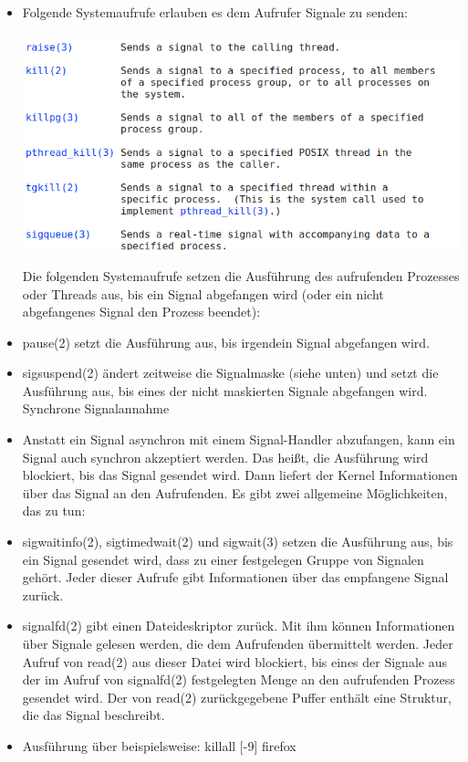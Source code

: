 \documentclass[a4paper]{article}
\begin{document}
\begin{itemize}
\begin{center}
          \end{center}
    \item Folgende Systemaufrufe erlauben es dem Aufrufer Signale zu senden:
          \begin{center}
              \includegraphics[width=0.5\linewidth]{Assets/Betriebssysteme_uebung/u6_a21.png}
          \end{center}
          Die  folgenden  Systemaufrufe setzen die Ausführung des aufrufenden Prozesses oder Threads aus, bis ein Signal abgefangen wird  (oder  ein  nicht  abgefangenes  Signal  den  Prozess
          beendet):
    \item pause(2) setzt die Ausführung aus, bis irgendein Signal abgefangen wird.
    \item sigsuspend(2)   ändert  zeitweise  die  Signalmaske (siehe unten) und setzt die Ausführung aus, bis eines der nicht maskierten Signale abgefangen wird. Synchrone Signalannahme
    \item Anstatt ein Signal asynchron mit einem Signal-Handler abzufangen,  kann  ein  Signal  auch synchron  akzeptiert  werden.  Das  heißt,  die  Ausführung wird blockiert, bis das Signal gesendet wird. Dann liefert der Kernel Informationen über das Signal an  den  Aufrufenden. Es gibt zwei allgemeine Möglichkeiten, das zu tun:
    \item sigwaitinfo(2), sigtimedwait(2) und sigwait(3) setzen die Ausführung aus, bis ein Signal
          gesendet wird, dass zu einer  festgelegen  Gruppe  von  Signalen  gehört.  Jeder  dieser
          Aufrufe gibt Informationen über das empfangene Signal zurück.
    \item signalfd(2) gibt einen Dateideskriptor zurück. Mit ihm können Informationen über Signale
          gelesen werden, die dem Aufrufenden übermittelt werden. Jeder  Aufruf  von  read(2)  aus
          dieser  Datei  wird  blockiert,  bis eines der Signale aus der im Aufruf von signalfd(2)
          festgelegten  Menge  an  den  aufrufenden  Prozess  gesendet  wird.  Der   von   read(2)
          zurückgegebene Puffer enthält eine Struktur, die das Signal beschreibt.
    \item Ausführung über beispielsweise: killall [-9] firefox
\end{itemize}
\end{document}
